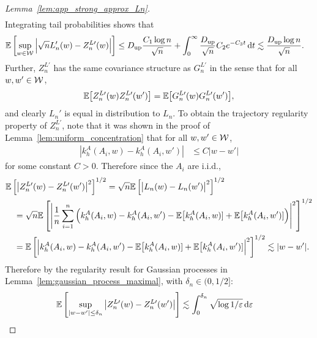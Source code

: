 \begin{proof}[Lemma~\ref{lem:app_strong_approx_Ln}]
\begin{align*}
  \end{align*}
  Integrating tail probabilities shows that
  \begin{align*}
    \mathbb{E}\left[
      \sup_{w \in \mathcal{W}}
      \Big|\sqrt{n} L_n'(w) - Z_n^{L\prime}(w)\Big|
    \right]
    &\leq
    D_{\textup{up}} \frac{C_1 \log n}{\sqrt n}
    + \int_0^\infty
    \frac{D_{\textup{up}}}{\sqrt n}
    C_2 e^{-C_3 t}
    \,\mathrm{d}t
    \lesssim
    \frac{D_{\textup{up}} \log n}{\sqrt n}.
  \end{align*}
  Further,
  $Z_n^{L\prime}$ has the
  same covariance structure as $G_n^{L\prime}$ in the
  sense that for all $w, w' \in \mathcal{W}$,
  \begin{align*}
    \mathbb{E}\big[Z_n^{L\prime}(w) Z_n^{L\prime}(w')\big]
    = \mathbb{E}\big[G_n^{L\prime}(w) G_n^{L\prime}(w')\big],
  \end{align*}
  and clearly
  $L_n'$
  is equal in distribution to $L_n$.
  To obtain the trajectory regularity property of
  $Z_n^{L\prime}$,
  note that it was shown in the proof of
  Lemma~\ref{lem:uniform_concentration}
  that for all $w,w' \in \mathcal{W}$,
  \begin{align*}
    \left|
    k_h^A(A_i,w)
    - k_h^A(A_i,w')
    \right|
    &\leq
    C
    |w-w'|
  \end{align*}
  for some constant $C > 0$.
  Therefore
  since the $A_i$ are i.i.d.,
  \begin{align*}
    &\mathbb{E}\left[
      \big|
      Z_n^{L\prime}(w)
      - Z_n^{L\prime}(w')
      \big|^2
    \right]^{1/2}
    =
    \sqrt{n}
    \mathbb{E}\left[
      \big|
      L_n(w)
      - L_n(w')
      \big|^2
    \right]^{1/2} \\
    &\quad=
    \sqrt{n}
    \mathbb{E}\left[
      \left|
      \frac{1}{n}
      \sum_{i=1}^n
      \Big(
      k_h^A(A_i,w)
      - k_h^A(A_i,w')
      - \mathbb{E}\big[k_h^A(A_i,w)]
      + \mathbb{E}\big[k_h^A(A_i,w')]
      \Big)
      \right|^2
    \right]^{1/2} \\
    &\quad=
    \mathbb{E}\left[
      \Big|
      k_h^A(A_i,w)
      - k_h^A(A_i,w')
      - \mathbb{E}\big[k_h^A(A_i,w)]
      + \mathbb{E}\big[k_h^A(A_i,w')]
      \Big|^2
    \right]^{1/2}
    \lesssim
    |w-w'|.
  \end{align*}
  Therefore by
  the regularity result for Gaussian processes in
  Lemma~\ref{lem:gaussian_process_maximal},
  with $\delta_n \in (0, 1/2]$:
  \begin{align*}
    \E\left[
      \sup_{|w-w'| \leq \delta_n}
      \big|
      Z_n^{L\prime}(w)
      - Z_n^{L\prime}(w')
      \big|
    \right]
    &\lesssim
    \int_0^{\delta_n}
    \sqrt{\log 1/\varepsilon}
    \diff{\varepsilon}

\end{align*}
\end{proof}
